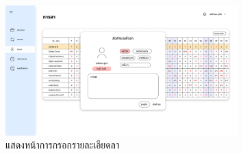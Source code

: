\begin{figure}
    \centering
    \includegraphics[width=0.8\textwidth]{ui11.png}
    \caption{แสดงหน้าการกรอกรายละเอียดลา}
\end{figure}
